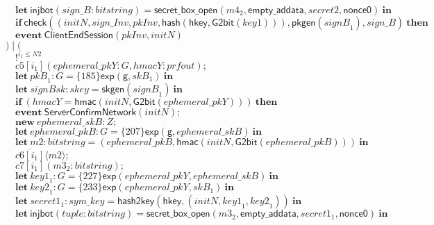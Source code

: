 \documentclass{article}
\newcommand{\cinput}[2]{{#1}({#2})}
\newcommand{\coutput}[2]{\overline{#1}\langle{#2}\rangle}
\newcommand{\kw}[1]{\mathbf{#1}}
\newcommand{\kwf}[1]{\mathsf{#1}}
\newcommand{\var}[1]{\mathit{#1}}
\newcommand{\kwt}[1]{\mathit{#1}}
\newcommand{\kwp}[1]{\mathit{#1}}
\newcommand{\kwc}[1]{\mathit{#1}}
\begin{document}
\begin{tabbing}
\>$\quad \kw{let}\ \kwf{injbot}(\var{sign{\_}B}: \kwt{bitstring}) = \kwf{secret{\_}box{\_}open}(\var{m4}_{2}, \kwf{empty{\_}addata}, \var{secret2}, \kwf{nonce0})\ \kw{in}$\\
\>$\quad \kw{if}\ \kwf{check}(\kwf{}(\var{initN}, \var{sign{\_}Inv}, \var{pkInv}, \kwf{hash}(\kwf{hkey}, \kwf{G2bit}(\var{key1}))), \kwf{pkgen}(\var{signB}_{1}), \var{sign{\_}B})\ \kw{then}$\\
\>$\quad \kw{event}\ \kwf{ClientEndSession}(\var{pkInv}, \var{initN})$\\
\>$) \mid ($\\
\>$\quad !^{\var{i}_{1} \leq \kwp{N2}}$\\
\>$\quad \cinput{\kwc{c5}[\var{i}_{1}]}{\var{ephemeral{\_}pkY}: \kwt{G}, \var{hmacY}: \kwt{prfout}};$\\
\>$\quad \kw{let}\ \var{pkB}_{1}: \kwt{G} = \{185\}\kwf{exp}(\kwf{g}, \var{skB}_{1})\ \kw{in}$\\
\>$\quad \kw{let}\ \var{signBsk}: \kwt{skey} = \kwf{skgen}(\var{signB}_{1})\ \kw{in}$\\
\>$\quad \kw{if}\ (\var{hmacY}  =  \kwf{hmac}(\var{initN}, \kwf{G2bit}(\var{ephemeral{\_}pkY})))\ \kw{then}$\\
\>$\quad \kw{event}\ \kwf{ServerConfirmNetwork}(\var{initN});$\\
\>$\quad \kw{new}\ \var{ephemeral{\_}skB}: \kwt{Z};$\\
\>$\quad \kw{let}\ \var{ephemeral{\_}pkB}: \kwt{G} = \{207\}\kwf{exp}(\kwf{g}, \var{ephemeral{\_}skB})\ \kw{in}$\\
\>$\quad \kw{let}\ \var{m2}: \kwt{bitstring} = \kwf{}(\var{ephemeral{\_}pkB}, \kwf{hmac}(\var{initN}, \kwf{G2bit}(\var{ephemeral{\_}pkB})))\ \kw{in}$\\
\>$\quad \coutput{\kwc{c6}[\var{i}_{1}]}{\var{m2}};$\\
\>$\quad \cinput{\kwc{c7}[\var{i}_{1}]}{\var{m3}_{2}: \kwt{bitstring}};$\\
\>$\quad \kw{let}\ \var{key1}_{1}: \kwt{G} = \{227\}\kwf{exp}(\var{ephemeral{\_}pkY}, \var{ephemeral{\_}skB})\ \kw{in}$\\
\>$\quad \kw{let}\ \var{key2}_{1}: \kwt{G} = \{233\}\kwf{exp}(\var{ephemeral{\_}pkY}, \var{skB}_{1})\ \kw{in}$\\
\>$\quad \kw{let}\ \var{secret1}_{1}: \kwt{sym{\_}key} = \kwf{hash2key}(\kwf{hkey}, \kwf{}(\var{initN}, \var{key1}_{1}, \var{key2}_{1}))\ \kw{in}$\\
\>$\quad \kw{let}\ \kwf{injbot}(\var{tuple}: \kwt{bitstring}) = \kwf{secret{\_}box{\_}open}(\var{m3}_{2}, \kwf{empty{\_}addata}, \var{secret1}_{1}, \kwf{nonce0})\ \kw{in}$\\

\end{tabbing}
\end{document}
